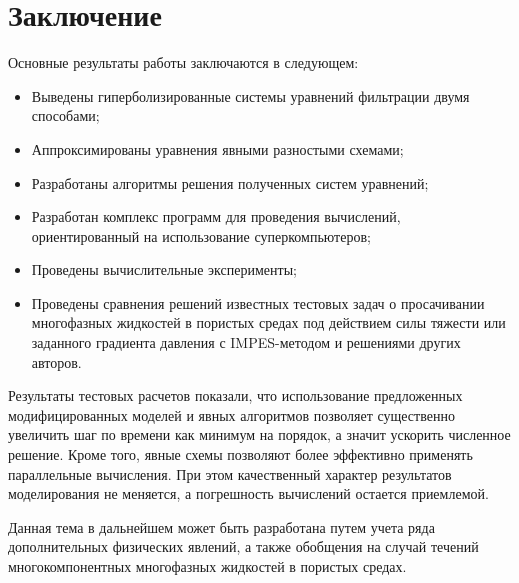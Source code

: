 \chapter*{Заключение}                       %


Основные результаты работы заключаются в следующем:
\begin{itemize}
 \item Выведены гиперболизированные системы уравнений фильтрации двумя способами;
 \item Аппроксимированы уравнения явными разностыми схемами;
 \item Разработаны алгоритмы решения полученных систем уравнений;
 \item Разработан комплекс программ для проведения вычислений, ориентированный на использование суперкомпьютеров;
 \item Проведены вычислительные эксперименты;
 \item Проведены сравнения решений известных тестовых задач о просачивании многофазных жидкостей в пористых средах под действием силы тяжести или заданного градиента давления с IMPES-методом и решениями других авторов.
\end{itemize}

Результаты тестовых расчетов показали, что использование предложенных модифицированных моделей и явных алгоритмов позволяет существенно увеличить шаг по времени как минимум на порядок, а значит ускорить численное решение. Кроме того, явные схемы позволяют более эффективно применять параллельные вычисления.
При этом качественный характер результатов моделирования не меняется, а погрешность вычислений остается приемлемой.

Данная тема в дальнейшем может быть разработана путем учета ряда дополнительных физических явлений, а также обобщения на случай течений многокомпонентных многофазных жидкостей в пористых средах.
